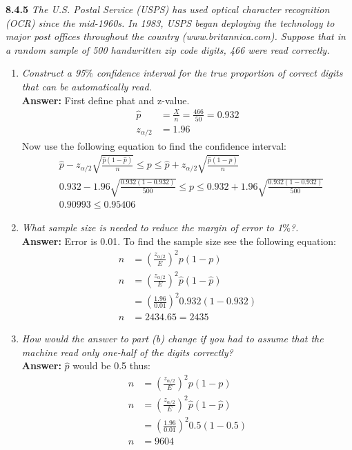 \documentclass[11pt]{article}
\begin{document}
\noindent \textbf{8.4.5} \emph{The U.S. Postal Service (USPS) has used optical character recognition (OCR) since the mid-1960s. In 1983, USPS began deploying the technology to major post offices throughout the country (www.britannica.com). Suppose that in a random sample of 500 handwritten zip code digits, 466 were read correctly.}
\begin{enumerate}
\item \emph{Construct a 95$\%$ confidence interval for the true proportion of correct digits that can be automatically read.}
\\\textbf{Answer:}
First define phat and z-value.
\begin{equation}
\begin{split}
\hat{p} &= \frac{X}{n} = \frac{466}{50} = 0.932\\
z_{\alpha/2} &= 1.96
\end{split}
\end{equation}
Now use the following equation to find the confidence interval:
\begin{equation}
\begin{split}
&\hat{p} - z_{\alpha/2}\sqrt{\frac{\hat{p}(1-\hat{p})}{n}} \leq p \leq \hat{p} + z_{\alpha/2}\sqrt{\frac{\hat{p}(1-\hat{p})}{n}} \\
&0.932 - 1.96\sqrt{\frac{0.932 (1-0.932 )}{500}} \leq p \leq 0.932 + 1.96\sqrt{\frac{0.932 (1-0.932 )}{500}} \\
&0.90993 \leq 0.95406 
\end{split}
\end{equation}
\item \emph{What sample size is needed to reduce the margin of error to 1$\%$?.}
\\\textbf{Answer:}
Error is 0.01. To find the sample size see the following equation:
\begin{equation}
\begin{split}
n &= (\frac{z_{\alpha/2}}{E})^2 p(1-p) \\
n &= (\frac{z_{\alpha/2}}{E})^2 \hat{p}(1-\hat{p}) \\
&= (\frac{1.96}{0.01})^2 0.932(1-0.932)\\
n&= 2434.65 = 2435
\end{split}
\end{equation}

\item \emph{How would the answer to part (b) change if you had to assume that the machine read only one-half of the digits correctly?}
\\\textbf{Answer:} $\hat{p}$ would be 0.5 thus:
\begin{equation}
\begin{split}
n &= (\frac{z_{\alpha/2}}{E})^2 p(1-p) \\
n &= (\frac{z_{\alpha/2}}{E})^2 \hat{p}(1-\hat{p}) \\
&= (\frac{1.96}{0.01})^2  0.5(1- 0.5)\\
n&=9604
\end{split}
\end{equation}










\end{enumerate}
\end{document}
